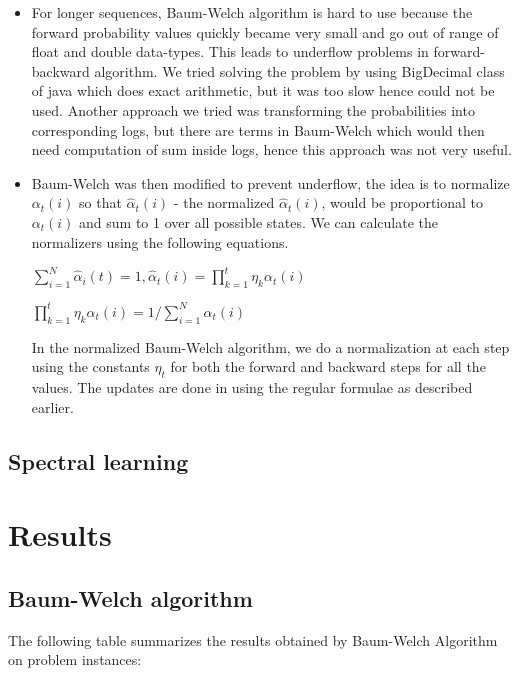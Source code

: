 \documentclass[letterpaper]{article}
\begin{document}
\begin{itemize}
\item For longer sequences, Baum-Welch algorithm is hard to use because the forward probability values quickly became very small and go out of range of float and double data-types. This leads to underflow problems in forward-backward algorithm. We tried solving the problem by using BigDecimal class of java which does exact arithmetic, but it was too slow hence could not be used. Another approach we tried was transforming the probabilities into corresponding logs, but there are terms in Baum-Welch which would then need computation of sum inside logs, hence this approach was not very useful.   

\item Baum-Welch was then modified  to prevent underflow, the idea is to normalize $\alpha_t(i)$ so that $\hat{\alpha}_{t}(i)$ - the normalized $\hat{\alpha}_{t}(i)$, would be proportional to $\alpha_{t}(i)$ and sum to 1 over all possible states. We can calculate the normalizers using the following equations. 

\begin{center}

$\sum_{i=1}^{N}\hat{\alpha}_{i}(t) = 1 , \hat{\alpha}_{t}(i) = \prod_{k=1}^t\eta_{k}\alpha_{t}(i)$ 

$\prod_{k=1}^t\eta_{k}\alpha_{t}(i) = 1/\sum_{i=1}^N\alpha_{t}(i)$

\end{center}

In the normalized Baum-Welch algorithm, we do a normalization at each step using the constants $\eta_{t}$ for both the forward and backward steps for all the values. The updates are done in using the regular formulae as described earlier.
 
\end{itemize}

\subsection{Spectral learning}



\section{Results}

\subsection{Baum-Welch algorithm}
The following table summarizes the results obtained by Baum-Welch Algorithm on problem instances:
\end{document}
